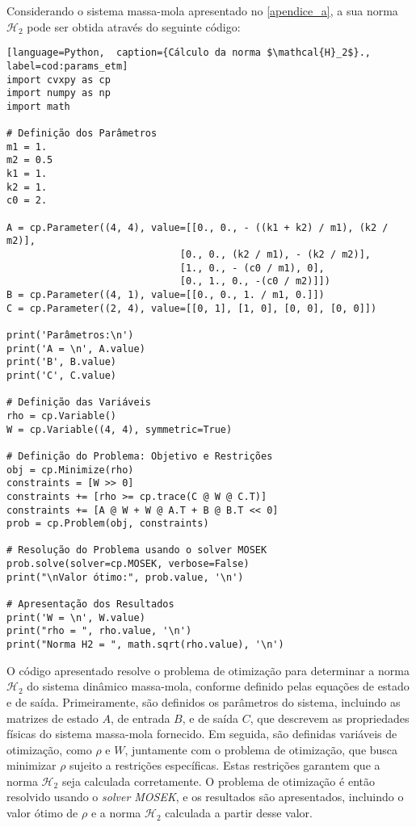 Considerando o sistema massa-mola apresentado no \autoref{apendice_a}, a sua norma $\mathscr{H}_2$ pode ser obtida através do seguinte código: 

\vspace{8pt}
\begin{lstlisting}[language=Python,  caption={Cálculo da norma $\mathcal{H}_2$}., label=cod:params_etm]
import cvxpy as cp
import numpy as np
import math

# Definição dos Parâmetros
m1 = 1.
m2 = 0.5
k1 = 1.
k2 = 1.
c0 = 2.

A = cp.Parameter((4, 4), value=[[0., 0., - ((k1 + k2) / m1), (k2 / m2)],
                              [0., 0., (k2 / m1), - (k2 / m2)],
                              [1., 0., - (c0 / m1), 0],
                              [0., 1., 0., -(c0 / m2)]])
B = cp.Parameter((4, 1), value=[[0., 0., 1. / m1, 0.]])
C = cp.Parameter((2, 4), value=[[0, 1], [1, 0], [0, 0], [0, 0]])

print('Parâmetros:\n')
print('A = \n', A.value)
print('B', B.value)
print('C', C.value)

# Definição das Variáveis
rho = cp.Variable()
W = cp.Variable((4, 4), symmetric=True)

# Definição do Problema: Objetivo e Restrições
obj = cp.Minimize(rho)
constraints = [W >> 0]
constraints += [rho >= cp.trace(C @ W @ C.T)]
constraints += [A @ W + W @ A.T + B @ B.T << 0]
prob = cp.Problem(obj, constraints)

# Resolução do Problema usando o solver MOSEK
prob.solve(solver=cp.MOSEK, verbose=False)
print("\nValor ótimo:", prob.value, '\n')

# Apresentação dos Resultados
print('W = \n', W.value)
print("rho = ", rho.value, '\n')
print("Norma H2 = ", math.sqrt(rho.value), '\n')

\end{lstlisting}

O código apresentado resolve o problema de otimização para determinar a norma $\mathscr{H}_2$ do sistema dinâmico massa-mola, conforme definido pelas equações de estado e de saída. Primeiramente, são definidos os parâmetros do sistema, incluindo as matrizes de estado $A$, de entrada $B$, e de saída $C$, que descrevem as propriedades físicas do sistema massa-mola fornecido. Em seguida, são definidas variáveis de otimização, como $\rho$ e $W$, juntamente com o problema de otimização, que busca minimizar $\rho$ sujeito a restrições específicas. Estas restrições garantem que a norma $\mathscr{H}_2$ seja calculada corretamente. O problema de otimização é então resolvido usando o \textit{solver MOSEK}, e os resultados são apresentados, incluindo o valor ótimo de $\rho$ e a norma $\mathscr{H}_2$ calculada a partir desse valor. 

